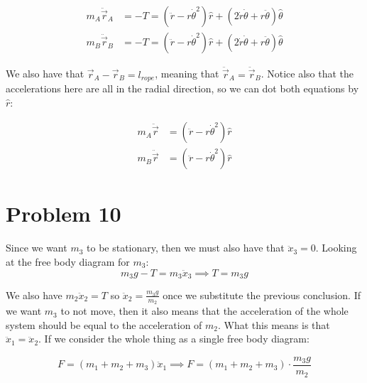 \documentclass{article}
\theoremstyle{definition}
\numberwithin{equation}{section}
\numberwithin{definition}{section}
\begin{document}
	\begin{align*}
		m_A \ddot {\vec r}_A &= -T = (\ddot r - r\dot \theta^2)\hat r + (2\dot r \dot \theta + r \ddot \theta)\hat \theta\\
		m_B \ddot {\vec r}_B &= -T = (\ddot r - r\dot \theta^2)\hat r + (2\dot r \dot \theta + r \ddot \theta)\hat \theta
	\end{align*}

	We also have that $\vec r_A - \vec r_B = l_{rope}$, meaning that $\ddot{\vec r}_A = \ddot {\vec r}_B$. Notice also that the accelerations here are all in the radial direction, so we can dot both equations by $\hat r$:
	
	\begin{align*}
		m_A \ddot \vec r &= (\ddot r - r\dot \theta^2)\hat r\\
		m_B \ddot \vec r &= (\ddot r - r\dot \theta^2)\hat r
	\end{align*} 
	
	
	\section{Problem 10}
	
	Since we want $m_3$ to be stationary, then we must also have that $\ddot x_3 = 0$. Looking at the free body diagram for $m_3$:
	\[ m_3g  -T = m_3\ddot x_3 \implies T = m_3g\]
	
	We also have $m_2 \ddot x_2 = T$ so $\ddot x_2 = \frac{m_3g}{m_2}$ once we substitute the previous conclusion. If we want $m_3$ to not move, then it also means that the acceleration of the whole system should be equal to the acceleration of $m_2$. What this means is that $\ddot x_1 = \ddot x_2$. If we consider the whole thing as a single free body diagram:
	
	\[F = (m_1 + m_2 + m_3)\ddot x_1 \implies \boxed{F = (m_1 + m_2 + m_3) \cdot \frac{m_3g}{m_2}}\]
	
	
\end{document}
